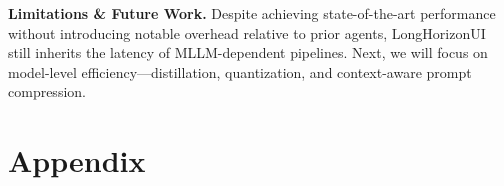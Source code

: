 \documentclass{article} %
\newcommand{\mypara}[1]{\vspace{0.4em}\noindent\textbf{#1}\hspace{0.2cm}}
\begin{document}
\mypara{Limitations \& Future Work.}
Despite achieving state-of-the-art performance without introducing notable overhead relative to prior agents, LongHorizonUI still inherits the latency of MLLM-dependent pipelines. Next, we will focus on model-level efficiency—distillation, quantization, and context-aware prompt compression.





\clearpage             %
\color{black}          %




\clearpage
\appendix
\section*{Appendix}
\end{document}
